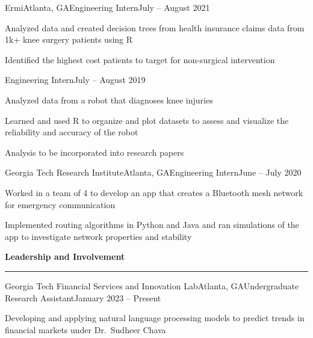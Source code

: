 \documentclass{article}
\newcommand{\horizontal}{\vspace{2pt}\hrule}
\newcommand{\sectitle}[1]{\vspace{2pt} \textbf{\large #1} \horizontal}
\begin{document}
\begin{flushleft}
    \begin{experience}{Ermi}{Atlanta, GA}{Engineering Intern}{July -- August 2021}
        \item Analyzed data and created decision trees from health insurance claims data from 1k+ knee surgery patients using R
        \item Identified the highest cost patients to target for non-surgical intervention
    \end{experience}
    \begin{subexperience}{Engineering Intern}{July -- August 2019}
        \item Analyzed data from a robot that diagnoses knee injuries
        \item Learned and used R to organize and plot datasets to assess and visualize the reliability and accuracy of the robot
        \item Analysis to be incorporated into research papers
    \end{subexperience}

    \begin{experience}{Georgia Tech Research Institute}{Atlanta, GA}{Engineering Intern}{June -- July 2020}
        \item Worked in a team of 4 to develop an app that creates a Bluetooth mesh network for emergency communication
        \item Implemented routing algorithms in Python and Java and ran simulations of the app to investigate network properties and stability
    \end{experience}


\sectitle{Leadership and Involvement}

    \begin{experience}{Georgia Tech Financial Services and Innovation Lab}{Atlanta, GA}{Undergraduate Research Assistant}{January 2023 -- Present}
        \item Developing and applying natural language processing models to predict trends in financial markets under Dr.~Sudheer Chava
    \end{experience}


\end{flushleft}
\end{document}
